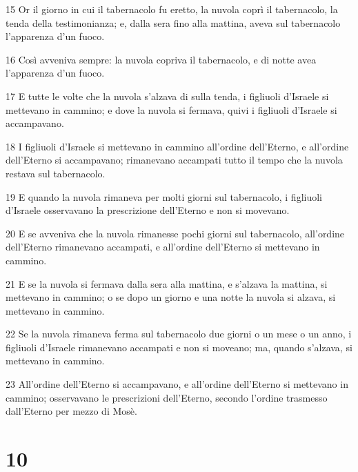 \par 15 Or il giorno in cui il tabernacolo fu eretto, la nuvola coprì il tabernacolo, la tenda della testimonianza; e, dalla sera fino alla mattina, aveva sul tabernacolo l'apparenza d'un fuoco.
\par 16 Così avveniva sempre: la nuvola copriva il tabernacolo, e di notte avea l'apparenza d'un fuoco.
\par 17 E tutte le volte che la nuvola s'alzava di sulla tenda, i figliuoli d'Israele si mettevano in cammino; e dove la nuvola si fermava, quivi i figliuoli d'Israele si accampavano.
\par 18 I figliuoli d'Israele si mettevano in cammino all'ordine dell'Eterno, e all'ordine dell'Eterno si accampavano; rimanevano accampati tutto il tempo che la nuvola restava sul tabernacolo.
\par 19 E quando la nuvola rimaneva per molti giorni sul tabernacolo, i figliuoli d'Israele osservavano la prescrizione dell'Eterno e non si movevano.
\par 20 E se avveniva che la nuvola rimanesse pochi giorni sul tabernacolo, all'ordine dell'Eterno rimanevano accampati, e all'ordine dell'Eterno si mettevano in cammino.
\par 21 E se la nuvola si fermava dalla sera alla mattina, e s'alzava la mattina, si mettevano in cammino; o se dopo un giorno e una notte la nuvola si alzava, si mettevano in cammino.
\par 22 Se la nuvola rimaneva ferma sul tabernacolo due giorni o un mese o un anno, i figliuoli d'Israele rimanevano accampati e non si moveano; ma, quando s'alzava, si mettevano in cammino.
\par 23 All'ordine dell'Eterno si accampavano, e all'ordine dell'Eterno si mettevano in cammino; osservavano le prescrizioni dell'Eterno, secondo l'ordine trasmesso dall'Eterno per mezzo di Mosè.

\chapter{10}

